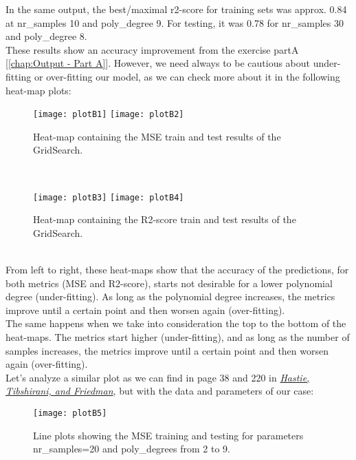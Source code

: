 In the same output, the best/maximal r2-score for training sets was approx. 0.84 at nr\_samples 10 and poly\_degree 9. For testing, it was 0.78 for nr\_samples 30 and poly\_degree 8.\\

These results show an accuracy improvement from the exercise partA [\ref{chap:Output - Part A}]. However, we need always to be cautious about under-fitting or over-fitting our model, as we can check more about it in the following heat-map plots:\\

\begin{figure}[H]
\label{fig:plotB1and2}
\centering
\texttt{[image: plotB1]}
\texttt{[image: plotB2]}
\caption{Heat-map containing the MSE train and test results of the GridSearch.}
\end{figure}\\

\begin{figure}[H]
\label{fig:plotB3and4}
\centering
\texttt{[image: plotB3]}
\texttt{[image: plotB4]}
\caption{Heat-map containing the R2-score train and test results of the GridSearch.}
\end{figure}\\

From left to right, these heat-maps show that the accuracy of the predictions, for both metrics (MSE and R2-score), starts not desirable for a lower polynomial degree (under-fitting). As long as the polynomial degree increases, the metrics improve until a certain point and then worsen again (over-fitting).\\

The same happens when we take into consideration the top to the bottom of the heat-maps. The metrics start higher (under-fitting), and as long as the number of samples increases, the metrics improve until a certain point and then worsen again (over-fitting).\\

Let's analyze a similar plot as we can find in page 38 and 220 in \hyperref[Bib:TheElementsOfStatisticalLearningDataMining]{\textit{Hastie, Tibshirani, and Friedman}}, but with the data and parameters of our case:\\

\begin{figure}[H]
\label{fig:plotB5}
\centering
\texttt{[image: plotB5]}
\caption{Line plots showing the MSE training and testing for parameters nr\_samples=20 and poly\_degrees from 2 to 9.}
\end{figure}\\

